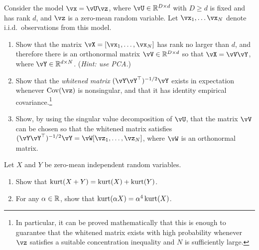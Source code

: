 \documentclass[\toplevelprefix/book-main.tex]{subfiles}
\begin{document}
\begin{exercise}\label{exercise:whitening}
    Consider the model $\vx = \vU \vz$, where $\vU \in \R^{D \times d}$ with $D \geq d$ is fixed and has rank $d$, and $\vz$ is a zero-mean random variable. Let $\vx_1, \dots \vx_N$ denote i.i.d.\ observations from this model.
    \begin{enumerate}
        \item Show that the matrix $\vX = [\vx_1, \dots, \vx_N]$ has rank no larger than $d$, and therefore there is an orthonormal matrix $\vV \in \R^{D \times d}$ so that $\vX = \vV \vY$, where $\vY \in \R^{d \times N}$. (\textit{Hint: use PCA.})
        \item Show that the \textit{whitened matrix} $(\vY \vY^\top)^{-1/2}\vY$ exists in expectation whenever $\Cov(\vz)$ is nonsingular, and that it has identity empirical covariance.\footnote{In particular, it can be proved mathematically that this is enough to guarantee that the whitened matrix exists with high probability whenever $\vz$ satisfies a suitable concentration inequality and $N$ is sufficiently large.}
        \item Show, by using the singular value decomposition of $\vU$, that the matrix $\vV$ can be chosen so that the whitened matrix satisfies $(\vY \vY^\top)^{-1/2} \vY = \vW [\vz_1, \dots, \vz_N]$, where $\vW$ is an orthonormal matrix.
    \end{enumerate}
\end{exercise}

\begin{exercise}\label{exercise:kurtosis-linearity-properties}
    Let $X$ and $Y$ be zero-mean independent random variables.
    \begin{enumerate}
        \item Show that $\mathop{\mathrm{kurt}}(X + Y) = \mathop{\mathrm{kurt}}(X) + \mathop{\mathrm{kurt}}(Y)$.
        \item For any $\alpha \in \mathbb{R}$, show that $\mathop{\mathrm{kurt}}(\alpha X) = \alpha^4 \mathop{\mathrm{kurt}}(X)$.
    \end{enumerate}
\end{exercise}
\end{document}
